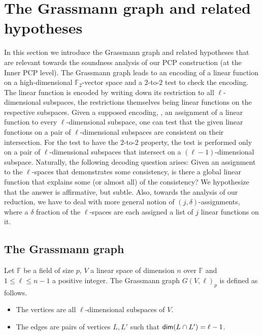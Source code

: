\documentclass{toc}
\renewcommand\leq{\leqslant}
\begin{document}
\section{The Grassmann graph and related hypotheses}\label{section:grassmann}
In this section we introduce the Grassmann graph and
related hypotheses that are relevant towards the soundness analysis
of our PCP construction (at the Inner PCP level).
The Grassmann graph leads to an encoding of a linear function
on a high-dimensional $\mathbb{F}_2$-vector space and a
$2$-to-$2$ test
%
 to check the encoding. The linear function
is encoded by writing down its restriction to all $\ell$-dimensional subspaces, the restrictions themselves being
linear functions on the respective subspaces.  %
Given a supposed encoding, \ie, an assignment of a linear function to every $\ell$-dimensional
subspace, one can test that the given
linear functions on a pair of $\ell$-dimensional subspaces are consistent
on their intersection. For the test to have the $2$-to-$2$ property, the test is performed only on a pair of $\ell$-dimensional
subspaces that intersect on a $(\ell-1)$-dimensional subspace.
Naturally, the following decoding
%
 question arises: Given an assignment to the $\ell$-spaces that demonstrates some consistency,
is there a global linear function that explains some (or almost all) of the consistency? We hypothesize that the answer
is affirmative, but subtle. Also, towards the analysis of our reduction, we have to deal
with more general notion of $(j,\delta)$-assignments,
%
where a $\delta$ fraction of the $\ell$-spaces are each assigned a list of $j$
linear functions on it.


\subsection{The Grassmann graph}
Let $\mathbb{F}$ be a field of size $p$, $V$ a linear space of dimension $n$ over
$\mathbb{F}$ and $1 \leq \ell \leq n-1$ a positive integer. The Grassmann graph
$G(V,\ell)_p$ is defined as follows. %
\begin{itemize}
\item The vertices are all $\ell$-dimensional subspaces of $V$.
\item The edges are pairs of vertices $L,L'$ such that ${\sf dim}(L\cap L')=\ell - 1$.
\end{itemize}
%
\end{document}
